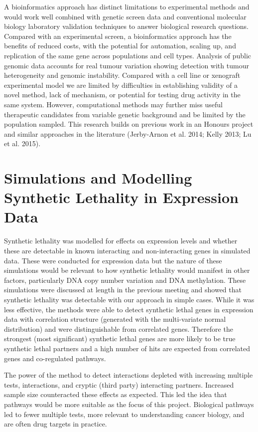 A bioinformatics approach has distinct limitations to experimental methods and would work well combined with genetic screen data and conventional molecular biology laboratory validation techniques to answer biological research questions.  Compared with an experimental screen, a bioinformatics approach has the benefits of reduced costs, with the potential for automation, scaling up, and replication of the same gene across populations and cell types.  Analysis of public genomic data accounts for real tumour variation showing detection with tumour heterogeneity and genomic instability.  Compared with a cell line or xenograft experimental model we are limited by difficulties in establishing validity of a novel method, lack of mechanism, or potential for testing drug activity in the same system.  However, computational methods may further miss useful therapeutic candidates from variable genetic background and be limited by the population sampled.  This research builds on previous work in an Honours project and similar approaches in the literature (Jerby-Arnon et al. 2014; Kelly 2013; Lu et al. 2015).

\section{Simulations and Modelling Synthetic Lethality in Expression Data}

Synthetic lethality was modelled for effects on expression levels and whether these are detectable in known interacting and non-interacting genes in simulated data. These were conducted for expression data but the nature of these simulations would be relevant to how synthetic lethality would manifest in other factors, particularly DNA copy number variation and DNA methylation. These simulations were discussed at length in the previous meeting and showed that synthetic lethality was detectable with our approach in simple cases. While it was less effective, the methods were able to detect synthetic lethal genes in expression data with correlation structure (generated with the multi-variate normal distribution) and were distinguishable from correlated genes. Therefore the strongest (most significant) synthetic lethal genes are more likely to be true synthetic lethal partners and a high number of hits are expected from correlated genes and co-regulated pathways.

The power of the method to detect interactions depleted with increasing multiple tests, interactions, and cryptic (third party) interacting partners. Increased sample size counteracted these effects as expected. This led the idea that pathways would be more suitable as the focus of this project. Biological pathways led to fewer multiple tests, more relevant to understanding cancer biology, and are often drug targets in practice.

